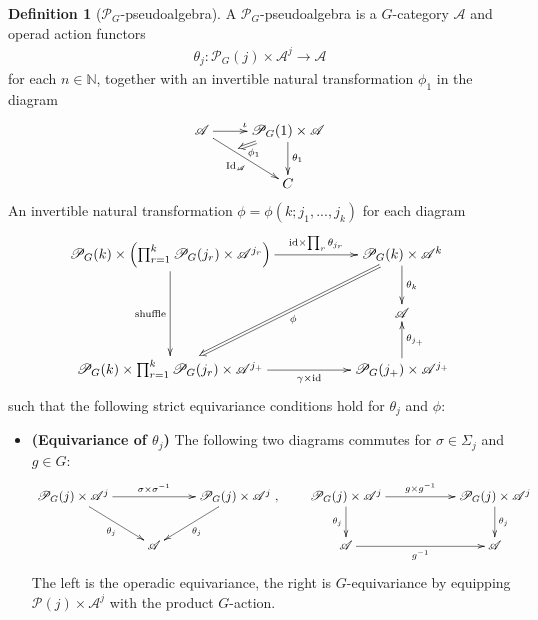 \documentclass[openany, amssymb, psamsfonts]{amsart}
\theoremstyle{definition}
\newtheorem{defn}{Definition}[section]
\numberwithin{equation}{section}
\newcommand{\cP}{\mathscr{P}} %
\newcommand{\A}{\mathscr{A}}
\newcommand{\NN}{\mathbb{N}} %
\newcommand{\id}{\mathrm{id}} %
\newcommand{\Id}{\mathrm{Id}} %
\begin{document}
\begin{defn}[$\cP_G$-pseudoalgebra]\label{defn_P_G_psalg}
    A $\cP_G$-pseudoalgebra is a $G$-category $\A$ and operad action functors
    \begin{align*}
        \theta_j:\cP_G(j)\times \A^j\rightarrow\A
    \end{align*}
    for each $n\in\NN$, together with an invertible natural transformation $\phi_1$ in the diagram
    \begin{align}
        \xymatrix{ 
        \A\ar[r]^{\iota}\ar[dr]_{\Id_\A} & \cP_G(1)\times\A\ar[d]^{\theta_1}\ar@{=>}[dl]+<26pt>^>>>>{\phi_1}\\ 
        & C
        }
    \end{align}
    An invertible natural transformation $\phi=\phi(k;j_1,...,j_k)$ for each diagram 
    \begin{align}
        \xymatrix{
            \cP_G(k) \times \left(\prod_{r=1}^k \cP_G(j_r)\times \A^{j_r}\right) \ar[dd]_-{\text{shuffle}} \ar[rr]^-{\id\times\prod_r\theta_{j_r}} && \cP_G(k)\times\A^k \ar[d]^-{\theta_k} \ar@{=>}[ddll]^-{\phi}\\
            && \A\\
            \cP_G(k)\times \prod_{r=1}^k\cP_G(j_r)\times \A^{j_+} \ar[rr]_-{\gamma\times\id} && \cP_G(j_+)\times\A^{j_+} \ar[u]_-{\theta_{j_+}}
        }
    \end{align}
    such that the following strict equivariance conditions hold for $\theta_j$ and $\phi$:
    \begin{itemize}
        \item[(i)]\textbf{(Equivariance of $\theta_j$)} The following two diagrams commutes for $\sigma\in\Sigma_j$ and $g\in G$:
        \begin{align}
            \xymatrix{
                \cP_G(j)\times \A^j \ar[dr]_-{\theta_j}  \ar[rr]^-{\sigma\times\sigma^{-1}} && \cP_G(j)\times \A^j \ar[dl]^-{\theta_j}\\
                & \A
            },\quad\quad \xymatrix{
                \cP_G(j)\times \A^j \ar[d]_-{\theta_j}  \ar[rr]^-{g\times g^{-1}} && \cP_G(j)\times \A^j \ar[d]^-{\theta_j}\\
                \A \ar[rr]_-{g^{-1}} && \A
            }
        \end{align}
        The left is the operadic equivariance, the right is $G$-equivariance by equipping $\cP(j)\times\A^j$ with the product $G$-action.

\end{itemize}
\end{defn}
\end{document}
